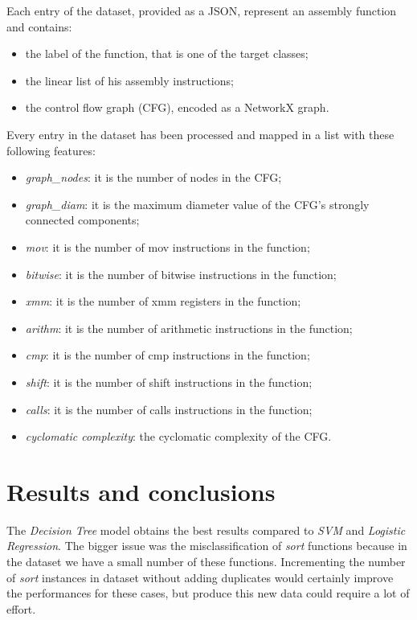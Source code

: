 \documentclass[11pt]{article}
\begin{document}
Each entry of the dataset, provided as a JSON, represent an assembly function and contains:
\begin{itemize}
    \item the label of the function, that is one of the target classes;
    \item the linear list of his assembly instructions;
    \item the control flow graph (CFG), encoded as a NetworkX graph.
\end{itemize}

Every entry in the dataset has been processed and mapped in a list with these following features:
\begin{multicols}{2}
    \begin{itemize}
        \item \textit{graph\_nodes}: it is the number of nodes in the CFG;
        \item \textit{graph\_diam}: it is the maximum diameter value of the CFG's strongly connected components;
        \item \textit{mov}: it is the number of mov instructions in the function;
        \item \textit{bitwise}: it is the number of bitwise instructions in the function;
        \item \textit{xmm}: it is the number of xmm registers in the function;
        \item \textit{arithm}: it is the number of arithmetic instructions in the function;
        \item \textit{cmp}: it is the number of cmp instructions in the function;
        \item \textit{shift}: it is the number of shift instructions in the function;
        \item \textit{calls}: it is the number of calls instructions in the function;
        \item \textit{cyclomatic complexity}: the cyclomatic complexity of the CFG.
    \end{itemize} 
\end{multicols}

\section{Results and conclusions}
The \textit{Decision Tree} model obtains the best results compared to \textit{SVM} and \textit{Logistic Regression}. The bigger issue was the misclassification of \textit{sort} functions because in the dataset we have a small number of these functions. Incrementing the number of \textit{sort} instances in dataset without adding duplicates would certainly improve the performances for these cases, but produce this new data could require a lot of effort.
\newpage
\end{document}
